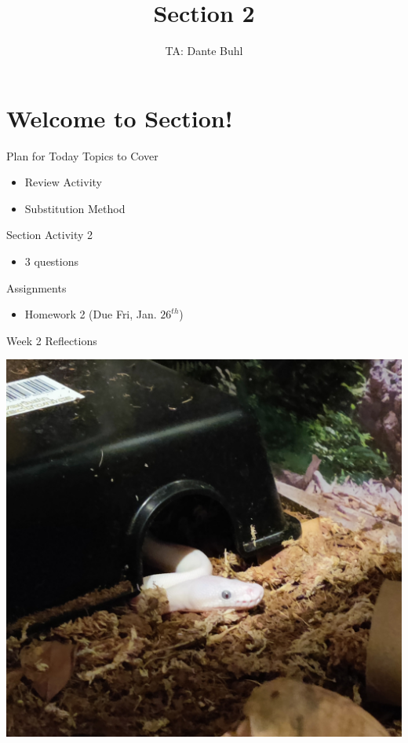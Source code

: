 \documentclass{beamer}
\title{Section 2}
\author{TA: Dante Buhl}
\institute{UCSC Math-19B}
\begin{document}
\newcommand{\bmp}[1]{\begin{minipage}{#1\textwidth}}
\newcommand{\emp}{\end{minipage}}


\frame{\titlepage}

\section{Welcome to Section!}
\begin{frame}{Plan for Today}
    Topics to Cover
    \begin{itemize}
        \item Review Activity
        \item Substitution Method
    \end{itemize}
    Section Activity 2
    \begin{itemize}
        \item 3 questions
    \end{itemize}
    Assignments
    \begin{itemize}
        \item Homework 2 (Due Fri, Jan. $26^{th}$)
    \end{itemize}
\end{frame}

\begin{frame}{Week 2 Reflections}
    
    \vspace{10pt}

    \bmp{.4}
       
    \emp
    \hspace{5pt}
    \bmp{.55}
        \centering
        \includegraphics[width=.75\textwidth]{duncan.jpg}
    \emp
\end{frame}
\end{document}
